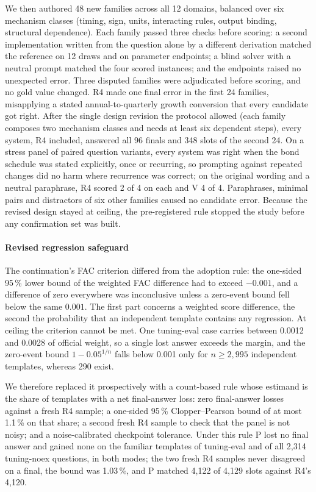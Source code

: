 \documentclass[conference]{IEEEtran}
\begin{document}
We then authored 48 new families across all 12 domains, balanced over six mechanism classes (timing, sign, units, interacting rules, output binding, structural dependence). Each family passed three checks before scoring: a second implementation written from the question alone by a different derivation matched the reference on 12 draws and on parameter endpoints; a blind solver with a neutral prompt matched the four scored instances; and the endpoints raised no unexpected error. Three disputed families were adjudicated before scoring, and no gold value changed. R4 made one final error in the first 24 families, misapplying a stated annual-to-quarterly growth conversion that every candidate got right. After the single design revision the protocol allowed (each family composes two mechanism classes and needs at least six dependent steps), every system, R4 included, answered all 96 finals and 348 slots of the second 24. On a stress panel of paired question variants, every system was right when the bond schedule was stated explicitly, once or recurring, so prompting against repeated changes did no harm where recurrence was correct; on the original wording and a neutral paraphrase, R4 scored 2 of 4 on each and V 4 of 4. Paraphrases, minimal pairs and distractors of six other families caused no candidate error. Because the revised design stayed at ceiling, the pre-registered rule stopped the study before any confirmation set was built.

\paragraph*{Revised regression safeguard} The continuation's FAC criterion differed from the adoption rule: the one-sided 95\,\% lower bound of the weighted FAC difference had to exceed $-0.001$, and a difference of zero everywhere was inconclusive unless a zero-event bound fell below the same $0.001$. The first part concerns a weighted score difference, the second the probability that an independent template contains any regression. At ceiling the criterion cannot be met. One tuning-eval case carries between 0.0012 and 0.0028 of official weight, so a single lost answer exceeds the margin, and the zero-event bound $1-0.05^{1/n}$ falls below 0.001 only for $n\ge2{,}995$ independent templates, whereas 290 exist.

We therefore replaced it prospectively with a count-based rule whose estimand is the share of templates with a net final-answer loss: zero final-answer losses against a fresh R4 sample; a one-sided 95\,\% Clopper--Pearson bound of at most 1.1\,\% on that share; a second fresh R4 sample to check that the panel is not noisy; and a noise-calibrated checkpoint tolerance. Under this rule P lost no final answer and gained none on the familiar templates of tuning-eval and of all 2,314 tuning-noex questions, in both modes; the two fresh R4 samples never disagreed on a final, the bound was 1.03\,\%, and P matched 4,122 of 4,129 slots against R4's 4,120.
\end{document}
